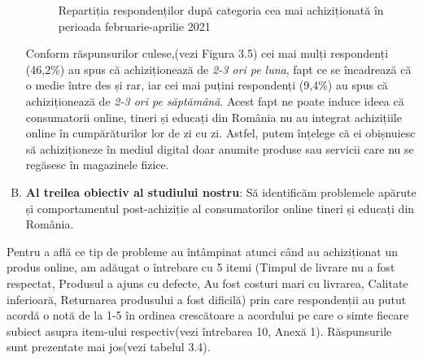 \documentclass[a4paper, 12pt]{article}
\begin{document}
\begin{enumerate}[(A)]
\begin{figure}[!htb]
			\caption{Repartiția respondenților după categoria cea mai achiziționată în perioada februarie-aprilie 2021} 
		\end{figure}
	
\newpage
		\qquad Conform răspunsurilor culese,(vezi Figura 3.5) cei mai mulți respondenți (46,2\%) au spus că achiziționează de \textit{2-3 ori pe luna}, fapt ce se încadrează că o medie între des și rar, iar cei mai puțini respondenți (9,4\%) au spus că achiziționează de \textit{2-3 ori pe săptămână}. Acest fapt ne poate induce ideea că consumatorii online, tineri și educați din România nu au integrat achizițiile online în cumpărăturilor lor de zi cu zi. Astfel, putem înțelege că ei obișnuiesc să achiziționeze în mediul digital doar anumite produse sau servicii care nu se regăsesc în magazinele fizice.
\bigskip	
		\item \textbf{Al treilea obiectiv al studiului nostru}: Să identificăm problemele apărute și comportamentul post-achiziție al consumatorilor online tineri și educați din România.
	\end{enumerate}		
	\quad Pentru a află ce tip de probleme au întâmpinat atunci când au achiziționat un produs online, am adăugat o întrebare cu 5 itemi (Timpul de livrare nu a fost respectat, Produsul a ajuns cu defecte, Au fost costuri mari cu livrarea, Calitate inferioară, Returnarea produsului a fost dificilă) prin care respondenții au putut acordă o notă de la 1-5 în ordinea crescătoare a acordului pe care o simte fiecare subiect asupra item-ului respectiv(vezi întrebarea 10, Anexă 1). Răspunsurile sunt prezentate mai jos(vezi tabelul 3.4).
	\newline
	
\end{document}
